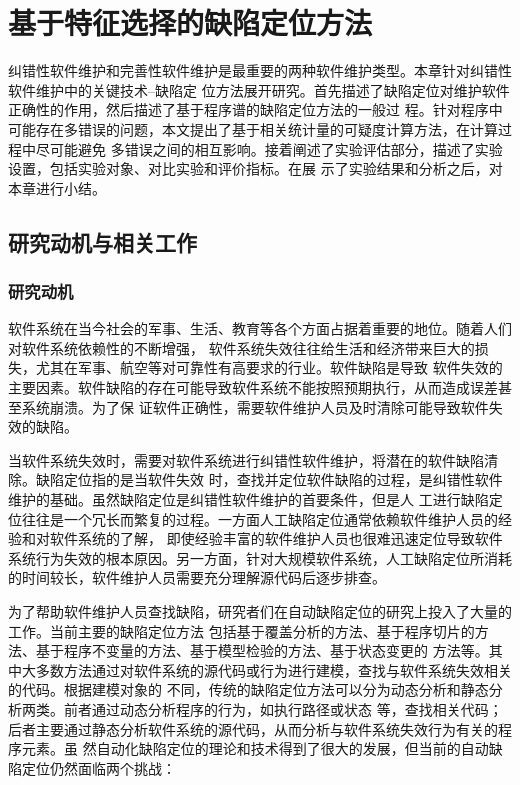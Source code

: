 
\chapter{基于特征选择的缺陷定位方法}
纠错性软件维护和完善性软件维护是最重要的两种软件维护类型。本章针对纠错性软件维护中的关键技术--缺陷定
位方法展开研究。首先描述了缺陷定位对维护软件正确性的作用，然后描述了基于程序谱的缺陷定位方法的一般过
程。针对程序中可能存在多错误的问题，本文提出了基于相关统计量的可疑度计算方法，在计算过程中尽可能避免
多错误之间的相互影响。接着阐述了实验评估部分，描述了实验设置，包括实验对象、对比实验和评价指标。在展
示了实验结果和分析之后，对本章进行小结。

\section{研究动机与相关工作}
\subsection{研究动机}\label{motivation1}
软件系统在当今社会的军事、生活、教育等各个方面占据着重要的地位。随着人们对软件系统依赖性的不断增强，
软件系统失效往往给生活和经济带来巨大的损失，尤其在军事、航空等对可靠性有高要求的行业。软件缺陷是导致
软件失效的主要因素。软件缺陷的存在可能导致软件系统不能按照预期执行，从而造成误差甚至系统崩溃。为了保
证软件正确性，需要软件维护人员及时清除可能导致软件失效的缺陷。

当软件系统失效时，需要对软件系统进行纠错性软件维护，将潜在的软件缺陷清除。缺陷定位指的是当软件失效
时，查找并定位软件缺陷的过程，是纠错性软件维护的基础。虽然缺陷定位是纠错性软件维护的首要条件，但是人
工进行缺陷定位往往是一个冗长而繁复的过程。一方面人工缺陷定位通常依赖软件维护人员的经验和对软件系统的了解，
即使经验丰富的软件维护人员也很难迅速定位导致软件系统行为失效的根本原因。另一方面，针对大规模软件系统，人工缺陷定位所消耗的时间较长，软件维护人员需要充分理解源代码后逐步排查。

为了帮助软件维护人员查找缺陷，研究者们在自动缺陷定位的研究上投入了大量的工作。当前主要的缺陷定位方法
包括基于覆盖分析的方法、基于程序切片的方法、基于程序不变量的方法、基于模型检验的方法、基于状态变更的
方法等。其中大多数方法通过对软件系统的源代码或行为进行建模，查找与软件系统失效相关的代码。根据建模对象的
不同，传统的缺陷定位方法可以分为动态分析和静态分析两类。前者通过动态分析程序的行为，如执行路径或状态
等，查找相关代码；后者主要通过静态分析软件系统的源代码，从而分析与软件系统失效行为有关的程序元素。虽
然自动化缺陷定位的理论和技术得到了很大的发展，但当前的自动缺陷定位仍然面临两个挑战：

